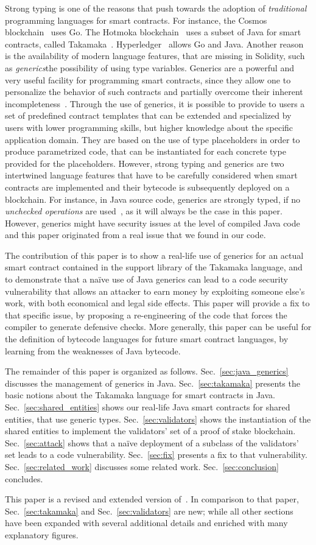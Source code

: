 Strong typing is one of the reasons that push towards the adoption
of \emph{traditional} programming languages for smart contracts. For instance,
the Cosmos blockchain~\cite{cosmos} uses Go. The
Hotmoka blockchain~\cite{hotmoka} uses a subset of Java
for smart contracts, called Takamaka~\cite{Spoto19,Spoto20}.
Hyperledger~\cite{hyperldeger} allows Go and Java.
Another reason is the availability of modern
language features, that are missing in Solidity,
such as \emph{generics}\ie the possibility of using
type variables. Generics are a powerful and very useful facility for programming
smart contracts, since they allow one to personalize the behavior of such contracts and partially overcome their inherent incompleteness~\cite{ebp}. 
%
Through the use of generics, it is possible to provide to users a set of predefined contract templates that can be extended and specialized by users with lower programming skills, but higher knowledge about the specific application domain. They are based on the use of type placeholders in order
to produce parametrized code, that can be instantiated for each
concrete type provided for the placeholders.
%
However, strong typing and generics are two intertwined language features that have to be carefully considered when smart contracts are implemented and their bytecode is subsequently deployed on a blockchain. For instance, in Java source code, generics are strongly typed, if no \emph{unchecked operations} are used~\cite{NaftalinW06}, as it will always be the case in this paper.
However, generics might have security issues at the level of compiled Java code and this paper originated from a real issue that we found in our code.



The contribution of this paper is to show a real-life
use of generics for an actual smart contract contained in the support
library of the Takamaka language, and to demonstrate that a na\"{i}ve use
of Java generics can lead to a code security vulnerability that
allows an attacker to earn money by exploiting someone else's work, with both economical and legal side effects.
This paper will provide a fix to that specific issue,
by proposing a re-engineering of the code that forces the compiler to generate defensive checks.
More generally, this paper can be useful for the definition of
bytecode languages for future smart contract languages, by
learning from the weaknesses of Java bytecode.

The remainder of this paper is organized as follows.
Sec.~\ref{sec:java_generics} discusses the management of generics in Java.
Sec.~\ref{sec:takamaka} presents the basic notions about the Takamaka language for smart contracts in Java.
Sec.~\ref{sec:shared_entities} shows our real-life Java smart
contracts for shared entities, that use generic types.
Sec.~\ref{sec:validators} shows the instantiation of the shared entities to implement the validators' set
of a proof of stake blockchain.
Sec.~\ref{sec:attack} shows that a na\"{i}ve
deployment of a subclass of the validators' set leads to a code vulnerability.
Sec.~\ref{sec:fix} presents a fix to that vulnerability.
Sec.~\ref{sec:related_work} discusses some related work.
Sec.~\ref{sec:conclusion} concludes.

This paper is a revised and extended version of~\cite{BeniniGMS21}.
In comparison to that paper, Sec.~\ref{sec:takamaka} and
Sec.~\ref{sec:validators} are new; while all other sections have been expanded with several additional details and enriched with many explanatory figures.

